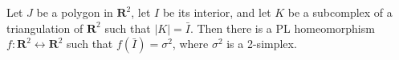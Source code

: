 Let $J$ be a polygon in $\mathbf{R}^2$, let $I$ be its interior, and let $K$ be a subcomplex of a triangulation of $\mathbf{R}^2$ such that $|K| = \bar{I}$. Then there is a PL homeomorphism $f: \mathbf{R}^2 \leftrightarrow \mathbf{R}^2$ such that $f(\bar{I}) = \sigma^2$, where $\sigma^2$ is a 2-simplex.
